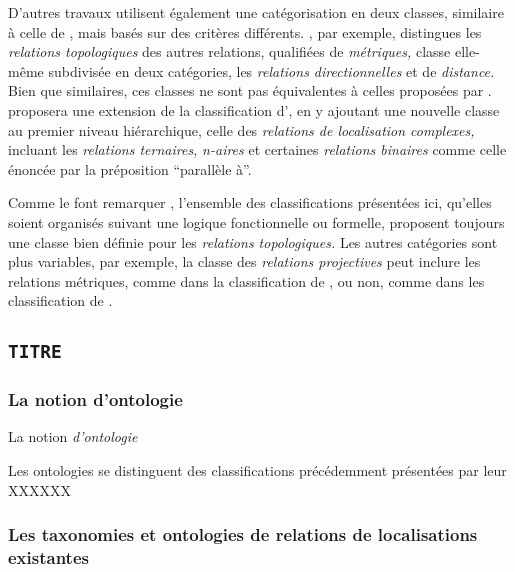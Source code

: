 D'autres travaux \autocite{Hudelot2008a} utilisent également une
catégorisation en deux classes, similaire à celle de
\textcite{Borillo1998}, mais basés sur des critères
différents. \textcite{Hudelot2008a}, par exemple, distingues les
\emph{relations topologiques} des autres relations, qualifiées de
\emph{métriques,} classe elle-même subdivisée en deux catégories, les
\emph{relations directionnelles} et de \emph{distance.} Bien que
similaires, ces classes ne sont pas équivalentes à celles proposées
par \textcite{Borillo1998}.
%
\textcite{Bloch2013} proposera une extension de la classification
d'\textcite{Hudelot2008a}, en y ajoutant une nouvelle classe au
premier niveau hiérarchique, celle des \emph{relations de localisation
  complexes,} incluant les \emph{relations ternaires,} \emph{n-aires}
et certaines \emph{relations binaires} comme celle énoncée par la
préposition \enquote{parallèle à}.


Comme le font remarquer \textcite{Duchene2019}, l'ensemble des
classifications présentées ici, qu'elles soient organisés suivant une
logique fonctionnelle ou formelle, proposent toujours une classe bien
définie pour les \emph{relations topologiques.} Les autres catégories
sont plus variables, par exemple, la classe des \emph{relations
  projectives} peut inclure les relations métriques, comme dans la
classification de \textcite{Borillo1998}, ou non, comme dans les
classification de \textcite{Bateman2010, Pustejovsky2017}.

\subsection{\texttt{TITRE}}

\subsubsection{La notion d'ontologie}

La notion \emph{d'ontologie}

Les ontologies se distinguent des classifications précédemment
présentées par leur XXXXXX



\subsubsection{Les taxonomies et ontologies de relations de localisations
  existantes}

